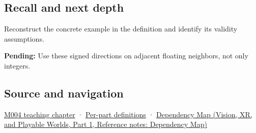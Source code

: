 \subsection{Recall and next depth}\label{appendix-637d164ae5ca-recall-and-next-depth}

\hypertarget{appendix-637d164ae5ca-recall-and-next-depth}{}

Reconstruct the concrete example in the definition and identify its validity assumptions.

\textbf{Pending:} Use these signed directions on adjacent floating neighbors, not only integers.

\subsection{Source and navigation}\label{appendix-637d164ae5ca-source-and-navigation}

\hypertarget{appendix-637d164ae5ca-source-and-navigation}{}

\hyperref[01-foundations-i-ch001-a-stretching-ruler-for-real-valued-quantities]{M004 teaching chapter} · \hyperref[appendix-fd090d982a15-m004---parts-61-76]{Per-part definitions} · \href{../07-Vision-XR-and-Playable-Worlds-P01/main.pdf\#appendix-4ad47bdd269a}{Dependency Map (Vision, XR, and Playable Worlds, Part 1, Reference notes: Dependency Map)}
